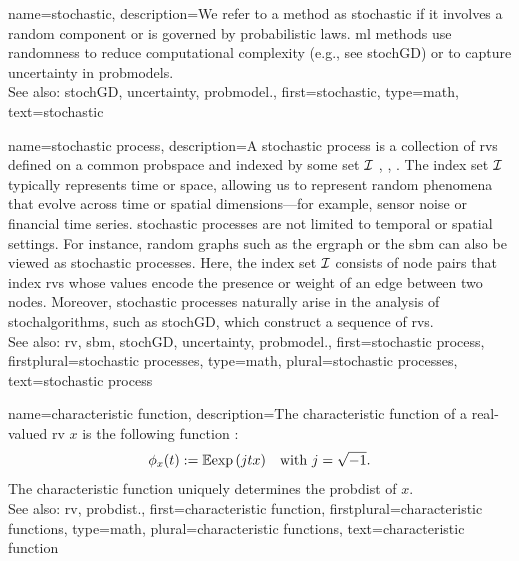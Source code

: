 {name={stochastic},
	description={We refer to a method as stochastic if it involves a 
		random component or is governed by probabilistic laws. \Gls{ml} methods use randomness 
		to reduce computational complexity (e.g., see \gls{stochGD}) or 
		to capture \gls{uncertainty} in \glspl{probmodel}.
		\\
		See also: \gls{stochGD}, \gls{uncertainty}, \gls{probmodel}.},
	first={stochastic},
	type=math, 
	text={stochastic}
}

{name={stochastic process},
	description={A \gls{stochastic} process is a collection of 
		\glspl{rv} defined on a common \gls{probspace} and indexed by some set 
		$\mathcal{I}$ \cite{GrayProbBook}, \cite{papoulis}, \cite{Brockwell91}. The index set 
		$\mathcal{I}$ typically represents time or space, allowing us to represent 
		random phenomena that evolve across time or spatial dimensions—for example, 
		sensor noise or financial time series. \Gls{stochastic} processes are not limited 
		to temporal or spatial settings. For instance, random \glspl{graph} such as 
		the \gls{ergraph} or the \gls{sbm} can also be viewed as \gls{stochastic} processes. 
		Here, the index set $\mathcal{I}$ consists of node pairs that index \glspl{rv} whose values 
		encode the presence or weight of an edge between two nodes. Moreover, \gls{stochastic} 
		processes naturally arise in the analysis of \glspl{stochalgorithm}, 
		such as \gls{stochGD}, which construct a \gls{sequence} of \glspl{rv}. 
		\\
		See also:  \gls{rv}, \gls{sbm}, \gls{stochGD}, \gls{uncertainty}, \gls{probmodel}.},
	first={stochastic process},
	firstplural={stochastic processes},
	type=math, 
	plural={stochastic processes},
	text={stochastic process}
}

{name={characteristic function},
	description={The characteristic \gls{function} 
		of a real-valued \gls{rv} $x$ is the following \gls{function} \cite[Sec. 26]{BillingsleyProbMeasure}:
		$$ \phi_{x}(t) := \mathbb{E} { \exp\,(j t x) } \quad \mbox{with } j = \sqrt{-1}.$$
	 	The characteristic \gls{function} uniquely determines the \gls{probdist} of $x$. 
		\\
		See also: \gls{rv}, \gls{probdist}.},
	first={characteristic function},
	firstplural={characteristic functions}, 
	type=math, 
	plural={characteristic functions},
	text={characteristic function}
}

